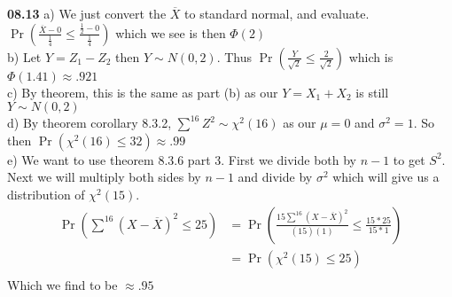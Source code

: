 

{\bf 08.13} a) We just convert the $\overline{X}$ to standard normal, and evaluate. 
$\Pr \left( \frac{ \overline{X} - 0}{\frac{1}{4}} \leq \frac{\frac{1}{2} - 0}{\frac{1}{4}} \right) $ which
we see is then $\Phi \left( 2 \right)$ \\

b) Let $Y = Z_1 - Z_2$ then $Y \sim N(0,2)$. Thus $ \Pr \left( \frac{Y}{\sqrt{2}} \leq \frac{2}{\sqrt{2}} \right)$
which is $\Phi \left( 1.41 \right) \approx .921$ \\

c) By theorem, this is the same as part (b) as our $Y = X_1 + X_2$ is still $Y \sim N(0,2)$ \\

d) By theorem corollary 8.3.2, $\sum^{16} Z^{2} \sim \chi^2 (16)$ as our $\mu = 0$ and $\sigma^2 = 1$.
So then $\Pr \left( \chi^2 (16) \leq 32 \right) \approx .99$ \\

e) We want to use theorem 8.3.6 part 3. First we divide both by $n-1$ to get $S^2$. 
Next we will multiply both sides by $n-1$ and divide by $\sigma^2$ which
will give us a distribution of $\chi^2 (15)$. 
\begin{align*}
	\Pr \left( \sum^{16} (X - \overline{X})^2 \leq  25 \right) &= 
			\Pr \left( \frac{15 \sum^{16} (X - \overline{X})^2}{(15)(1)}  \leq \frac{15 * 25}{15 * 1} \right) \\
	& =  \Pr \left( \chi^2 (15) \leq 25 \right) \\
\end{align*}
Which we find to be $\approx .95$


